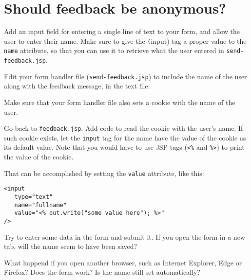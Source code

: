 \documentclass[a4paper, english]{article}
\begin{document}
    \newpage
    \section{Should feedback be anonymous?}
        Add an input field for entering a single line of text to your form, and allow the user to enter their name. Make sure to give the \texttt(input) tag a proper value to the \texttt{name} attribute, so that you can use it to retrieve what the user entered in \texttt{send-feedback.jsp}.

        Edit your form handler file (\texttt{send-feedback.jsp}) to include the name of the user along with the feedback message, in the text file.

        Make sure that your form handler file also sets a cookie with the name of the user.

        Go back to \texttt{feedback.jsp}. Add code to read the cookie with the user's name. If such cookie exists, let the \texttt{input} tag for the name have the value of the cookie as its default value. Note that you would have to use JSP tags (\texttt{<\%} and \texttt{\%>}) to print the value of the cookie.
        
        That can be accomplished by setting the \texttt{value} attribute, like this:
\begin{lstlisting}[style=customjsp]
<input
   type="text"
   name="fullname"
   value="<% out.write("some value here"); %>"
/>\end{lstlisting}

        Try to enter some data in the form and submit it. If you open the form in a new tab, will the name seem to have been saved?

        What happend if you open another browser, such as Internet Explorer, Edge or Firefox? Does the form work? Is the name still set automatically?
\end{document}
